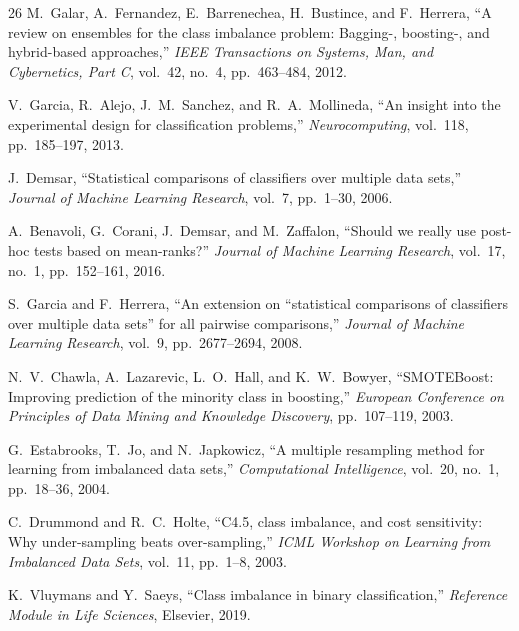 \documentclass[12pt,a4paper]{article}
\theoremstyle{definition}
\begin{document}
\begin{thebibliography}{26}
M.~Galar, A.~Fernandez, E.~Barrenechea, H.~Bustince, and F.~Herrera,
``A review on ensembles for the class imbalance problem: Bagging-, boosting-, and hybrid-based approaches,''
\emph{IEEE Transactions on Systems, Man, and Cybernetics, Part C}, vol.~42, no.~4, pp.~463--484, 2012.

V.~Garcia, R.~Alejo, J.~M.~Sanchez, and R.~A.~Mollineda,
``An insight into the experimental design for classification problems,''
\emph{Neurocomputing}, vol.~118, pp.~185--197, 2013.

J.~Demsar,
``Statistical comparisons of classifiers over multiple data sets,''
\emph{Journal of Machine Learning Research}, vol.~7, pp.~1--30, 2006.

A.~Benavoli, G.~Corani, J.~Demsar, and M.~Zaffalon,
``Should we really use post-hoc tests based on mean-ranks?''
\emph{Journal of Machine Learning Research}, vol.~17, no.~1, pp.~152--161, 2016.

S.~Garcia and F.~Herrera,
``An extension on ``statistical comparisons of classifiers over multiple data sets'' for all pairwise comparisons,''
\emph{Journal of Machine Learning Research}, vol.~9, pp.~2677--2694, 2008.

N.~V.~Chawla, A.~Lazarevic, L.~O.~Hall, and K.~W.~Bowyer,
``SMOTEBoost: Improving prediction of the minority class in boosting,''
\emph{European Conference on Principles of Data Mining and Knowledge Discovery}, pp.~107--119, 2003.

G.~Estabrooks, T.~Jo, and N.~Japkowicz,
``A multiple resampling method for learning from imbalanced data sets,''
\emph{Computational Intelligence}, vol.~20, no.~1, pp.~18--36, 2004.

C.~Drummond and R.~C.~Holte,
``C4.5, class imbalance, and cost sensitivity: Why under-sampling beats over-sampling,''
\emph{ICML Workshop on Learning from Imbalanced Data Sets}, vol.~11, pp.~1--8, 2003.

K.~Vluymans and Y.~Saeys,
``Class imbalance in binary classification,''
\emph{Reference Module in Life Sciences}, Elsevier, 2019.

\end{thebibliography}
\end{document}
